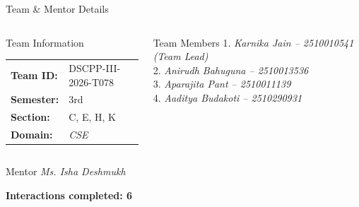 \documentclass[aspectratio=169,11pt]{beamer}
\newcommand{\smallnote}[1]{%
\vspace{0.08cm}
{\scriptsize\color{GEUGrey}#1}
}
\newcommand{\placeholder}[1]{%
\textit{\color{GEUGrey}#1}
}
\begin{document}
\begin{frame}{Team \& Mentor Details}

\begin{columns}[T,totalwidth=\textwidth]


\begin{block}{Team Information}
\begin{tabular}{@{}ll@{}}
\textbf{Team ID:} & DSCPP-III-2026-T078\\
\textbf{Semester:} & 3rd\\
\textbf{Section:} & C, E, H, K\\
\textbf{Domain:} & \placeholder{CSE}
\end{tabular}
\end{block}


\begin{block}{Team Members}
1.\quad \placeholder{Karnika Jain -- 2510010541 (Team Lead)}\\
2.\quad \placeholder{Anirudh Bahuguna -- 2510013536}\\
3.\quad \placeholder{Aparajita Pant -- 2510011139}\\
4.\quad \placeholder{Aaditya Budakoti -- 2510290931}
\end{block}

\end{columns}

\vspace{2mm}

\begin{block}{Mentor}
\placeholder{Ms. Isha Deshmukh}
\hfill
\textbf{Interactions completed: 6}
\underline{\hspace{12mm}}
\end{block}

\vfill


\end{frame}
\end{document}
